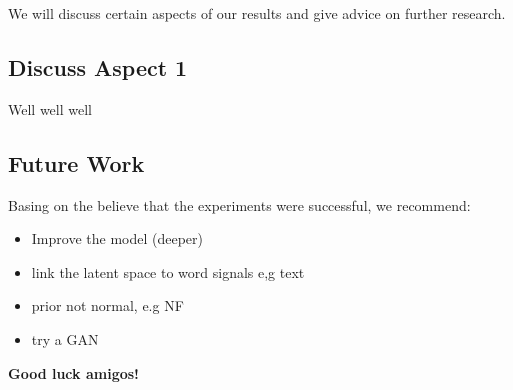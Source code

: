 We will discuss certain aspects of our results and give advice on further research.

\subsection{Discuss Aspect 1}
Well well well

\subsection{Future Work}
Basing on the believe that the experiments were successful, we recommend:

\begin{itemize}
    \item Improve the model (deeper)
    \item link the latent space to word signals e,g text
    \item prior not normal, e.g NF
    \item try a GAN
\end{itemize}

\textbf{Good luck amigos!}

